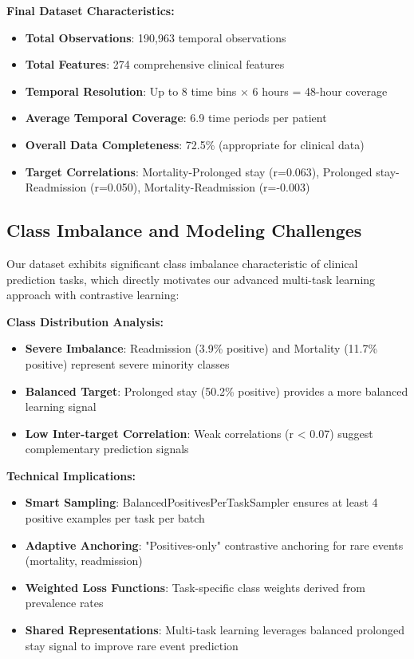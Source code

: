 \documentclass[11pt]{article}
\begin{document}
\textbf{Final Dataset Characteristics:}
\begin{itemize}
    \item \textbf{Total Observations}: 190,963 temporal observations
    \item \textbf{Total Features}: 274 comprehensive clinical features
    \item \textbf{Temporal Resolution}: Up to 8 time bins × 6 hours = 48-hour coverage
    \item \textbf{Average Temporal Coverage}: 6.9 time periods per patient
    \item \textbf{Overall Data Completeness}: 72.5\% (appropriate for clinical data)
    \item \textbf{Target Correlations}: Mortality-Prolonged stay (r=0.063), Prolonged stay-Readmission (r=0.050), Mortality-Readmission (r=-0.003)
\end{itemize}

\subsection{Class Imbalance and Modeling Challenges}

Our dataset exhibits significant class imbalance characteristic of clinical prediction tasks, which directly motivates our advanced multi-task learning approach with contrastive learning:

\textbf{Class Distribution Analysis:}
\begin{itemize}
    \item \textbf{Severe Imbalance}: Readmission (3.9\% positive) and Mortality (11.7\% positive) represent severe minority classes
    \item \textbf{Balanced Target}: Prolonged stay (50.2\% positive) provides a more balanced learning signal
    \item \textbf{Low Inter-target Correlation}: Weak correlations (r < 0.07) suggest complementary prediction signals
\end{itemize}

\textbf{Technical Implications:}
\begin{itemize}
    \item \textbf{Smart Sampling}: BalancedPositivesPerTaskSampler ensures at least 4 positive examples per task per batch
    \item \textbf{Adaptive Anchoring}: "Positives-only" contrastive anchoring for rare events (mortality, readmission)
    \item \textbf{Weighted Loss Functions}: Task-specific class weights derived from prevalence rates
    \item \textbf{Shared Representations}: Multi-task learning leverages balanced prolonged stay signal to improve rare event prediction
\end{itemize}
\end{document}
